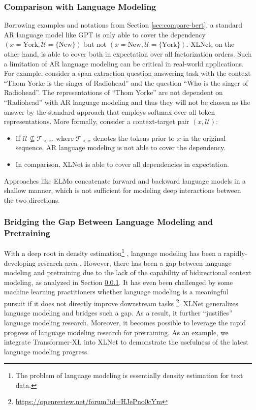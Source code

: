 \documentclass{article}
\newcommand{\mc}[1]{\mathcal{#1}}
\begin{document}
\subsubsection{Comparison with Language Modeling} \label{sec:compare-lm}

Borrowing examples and notations from Section \ref{sec:compare-bert}, a standard AR language model like GPT \cite{radford2018improving} is only able to cover the dependency $(x = \text{York}, \mc{U} = \{\text{New}\})$ but not $(x = \text{New}, \mc{U} = \{\text{York}\})$. XLNet, on the other hand, is able to cover both in expectation over all factorization orders. Such a limitation of AR language modeling can be critical in real-world applications. For example, consider a span extraction question answering task with the context ``Thom Yorke is the singer of Radiohead'' and the question ``Who is the singer of Radiohead''. The representations of ``Thom Yorke'' are not dependent on ``Radiohead'' with AR language modeling and thus they will not be chosen as the answer by the standard approach that employs softmax over all token representations. More formally, consider a context-target pair $(x, \mc{U})$:
\begin{itemize}[leftmargin=*,topsep=0em,itemsep=0em]
	\item If $\mc{U} \not\subseteq \mc{T}_{< x}$, where $\mc{T}_{<x}$ denotes the tokens prior to $x$ in the original sequence, AR language modeling is not able to cover the dependency.
	\item In comparison, XLNet is able to cover all dependencies in expectation.
\end{itemize}

Approaches like ELMo \cite{peters2018deep} concatenate forward and backward language models in a shallow manner, which is not sufficient for modeling deep interactions between the two directions.

\subsubsection{Bridging the Gap Between Language Modeling and Pretraining}

With a deep root in density estimation\footnote{The problem of language modeling is essentially density estimation for text data.} \cite{bengio2000modeling,uria2016neural,oord2016pixel}, language modeling has been a rapidly-developing research area \cite{dai2019transformer,al2018character,baevski2018adaptive}. However, there has been a gap between language modeling and pretraining due to the lack of the capability of bidirectional context modeling, as analyzed in Section \ref{sec:compare-lm}. It has even been challenged by some machine learning practitioners whether language modeling is a meaningful pursuit if it does not directly improve downstream tasks \footnote{\url{https://openreview.net/forum?id=HJePno0cYm}}. XLNet generalizes language modeling and bridges such a gap. As a result, it further ``justifies'' language modeling research. Moreover, it becomes possible to leverage the rapid progress of language modeling research for pretraining. As an example, we integrate Transformer-XL into XLNet to demonstrate the usefulness of the latest language modeling progress.
\end{document}
